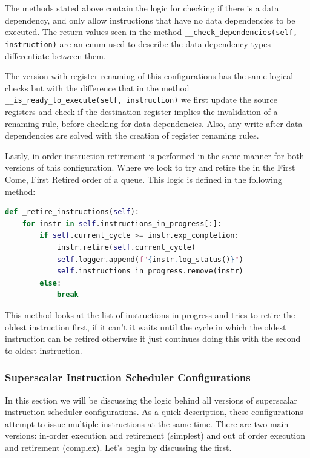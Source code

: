 \documentclass{article}
\begin{document}
The methods stated above contain the logic for checking if there is a data dependency, and only allow instructions that have no data dependencies to be executed. The return values seen in the method \lstinline|__check_dependencies(self, instruction)| are an enum used to describe the data dependency types differentiate between them.

The version with register renaming of this configurations has the same logical checks but with the difference that in the method \lstinline| __is_ready_to_execute(self, instruction)| we first update the source registers and check if the destination register implies the invalidation of a renaming rule, before checking for data dependencies. Also, any write-after data dependencies are solved with the creation of register renaming rules.

Lastly, in-order instruction retirement is performed in the same manner for both versions of this configuration. Where we look to try and retire the in the First Come, First Retired order of a queue. This logic is defined in the following method:

\begin{lstlisting}[language=Python]
def _retire_instructions(self): 
    for instr in self.instructions_in_progress[:]:
        if self.current_cycle >= instr.exp_completion:
            instr.retire(self.current_cycle)
            self.logger.append(f"{instr.log_status()}")
            self.instructions_in_progress.remove(instr)
        else:
            break
\end{lstlisting}

This method looks at the list of instructions in progress and tries to retire the oldest instruction first, if it can't it waits until the cycle in which the oldest instruction can be retired otherwise it just continues doing this with the second to oldest instruction.

\subsubsection{Superscalar Instruction Scheduler Configurations}
In this section we will be discussing the logic behind all versions of superscalar instruction scheduler configurations. As a quick description, these configurations attempt to issue multiple instructions at the same time. There are two main versions: in-order execution and retirement (simplest) and out of order execution and retirement (complex). Let's begin by discussing the first.
\end{document}
